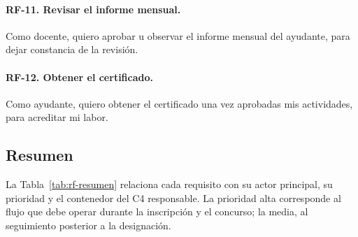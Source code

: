 \paragraph{RF-11. Revisar el informe mensual.} Como docente, quiero aprobar u observar el informe mensual del ayudante, para dejar constancia de la revisión.
\begin{itemize}
\end{itemize}

\paragraph{RF-12. Obtener el certificado.} Como ayudante, quiero obtener el certificado una vez aprobadas mis actividades, para acreditar mi labor.
\begin{itemize}
\end{itemize}

\subsection{Resumen}
La Tabla~\ref{tab:rf-resumen} relaciona cada requisito con su actor principal, su prioridad y el contenedor del C4 responsable. La prioridad alta corresponde al flujo que debe operar durante la inscripción y el concurso; la media, al seguimiento posterior a la designación.

